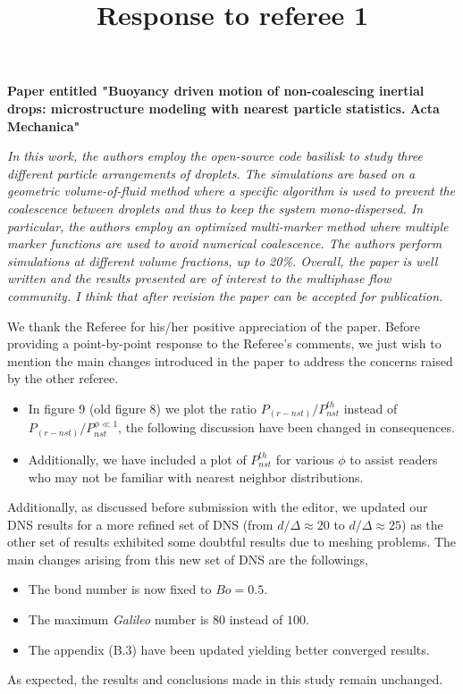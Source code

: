 \documentclass[10pt,a4paper]{article}
\begin{document}
\title{Response to referee 1} 
\maketitle
\textbf{Paper entitled "Buoyancy driven motion of non-coalescing inertial drops: microstructure modeling with nearest particle statistics.
Acta Mechanica"}
\bigskip

\textit{In this work, the authors employ the open-source code basilisk to study three different particle arrangements of droplets. The simulations are based on a geometric volume-of-fluid method where a specific algorithm is used to prevent the coalescence between droplets and thus to keep the system mono-dispersed. In particular, the authors employ an optimized multi-marker method where multiple marker functions are used to avoid numerical coalescence. The authors perform simulations at different volume fractions, up to 20\%. Overall, the paper is well written and the results presented are of interest to the multiphase flow community. I think that after revision the paper can be accepted for publication.}


\color{blue}
We thank the Referee for his/her positive appreciation of the paper. 
Before providing a point-by-point response to the Referee’s comments, we just wish to mention the main changes 
introduced in the paper to address the concerns raised by the other referee.
\begin{itemize}
    \item In figure 9 (old figure 8) we plot the ratio $P_{(r-nst)}/P_{nst}^{th}$ instead of $P_{(r-nst)}/P_{nst}^{\phi\ll 1}$, the following discussion have been changed in consequences. 
    \item Additionally, we have included a plot of $P_{nst}^{th}$ for various $\phi$ to assist readers who may not be familiar with nearest neighbor distributions. 
\end{itemize}

Additionally, as discussed before submission with the editor, we updated our DNS results for a more refined set of DNS (from $d/\Delta \approx 20$ to $d/\Delta \approx 25$) as the other set of results exhibited some doubtful results due to meshing problems. 
The main changes arising from this new set of DNS are the followings, 
\begin{itemize}
    \item The bond number is now fixed to $Bo = 0.5$. 
    \item The maximum \textit{Galileo} number is $80$ instead of $100$.
    \item The appendix (B.3) have been updated yielding better converged results. 
\end{itemize}  
As expected, the results and conclusions made in this study remain unchanged.
\color{black}
\end{document}
